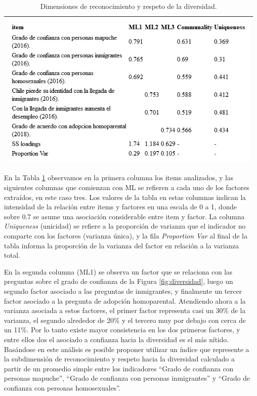 \documentclass[
  12pt,
]{book}
\begin{document}
\begin{longtable}[]{@{}l@{}}
\caption{\label{tab:div-fa}Dimensiones de reconocimiento y respeto de la diversidad.}\tabularnewline
\toprule
\endhead
\includegraphics[width=6.77083in,height=\textheight]{output/tables/div_fa.png}\tabularnewline
\bottomrule
\end{longtable}

En la Tabla \ref{tab:div-fa} observamos en la primera columna los items analizados, y las siguientes columnas que comienzan con ML se refieren a cada uno de los factores extraídos, en este caso tres. Los valores de la tabla en estas columnas indican la intensidad de la relación entre items y factores en una escala de 0 a 1, donde sobre 0.7 se asume una asociación considerable entre item y factor. La columna \emph{Uniqueness} (unicidad) se refiere a la proporción de varianza que el indicador no comparte con los factores (varianza única), y la fila \emph{Proportion Var} al final de la tabla informa la proporción de la varianza del factor en relación a la varianza total.

En la segunda columna (ML1) se observa un factor que se relaciona con las preguntas sobre el grado de confianza de la Figura \ref{fig:diversidad}, luego un segundo factor asociado a las preguntas de inmigrantes, y finalmente un tercer factor asociado a la pregunta de adopción homoparental. Atendiendo ahora a la varianza asociada a estos factores, el primer factor representa casi un 30\% de la varianza, el segundo alrededor de 20\% y el tercero muy por debajo con cerca de un 11\%. Por lo tanto existe mayor consistencia en los dos primeros factores, y entre ellos dos el asociado a confianza hacia la diversidad es el más nítido. Basándose en este análisis es posible proponer utilizar un índice que represente a la subdimensión de reconocimiento y respeto hacia la diversidad calculado a partir de un promedio simple entre los indicadores ``Grado de confianza con personas mapuche'', ``Grado de confianza con personas inmigrantes'' y ``Grado de confianza con personas homosexuales''.
\end{document}
